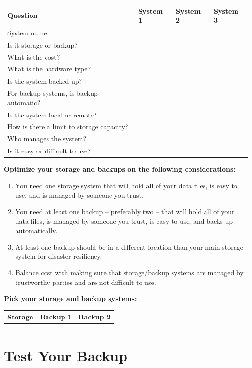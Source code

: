 \documentclass[
]{book}
\providecommand{\tightlist}{%
  \setlength{\itemsep}{0pt}\setlength{\parskip}{0pt}}
\begin{document}
\begin{tabular}{l|l|l|l}
\hline
Question & System 1 & System 2 & System 3\\
\hline
System name &  &  & \\
\hline
Is it storage or backup? &  &  & \\
\hline
What is the cost? &  &  & \\
\hline
What is the hardware type? &  &  & \\
\hline
Is the system backed up? &  &  & \\
\hline
For backup systems, is backup automatic? &  &  & \\
\hline
Is the system local or remote? &  &  & \\
\hline
How is there a limit to storage capacity? &  &  & \\
\hline
Who manages the system? &  &  & \\
\hline
Is it easy or difficult to use? &  &  & \\
\hline
\end{tabular}

\textbf{Optimize your storage and backups on the following considerations:}

\begin{enumerate}
\def\labelenumi{\arabic{enumi}.}
\tightlist
\item
  You need one storage system that will hold all of your data files, is easy to use, and is managed by someone you trust.
\item
  You need at least one backup -- preferably two -- that will hold all of your data files, is managed by someone you trust, is easy to use, and backs up automatically.
\item
  At least one backup should be in a different location than your main storage system for disaster resiliency.
\item
  Balance cost with making sure that storage/backup systems are managed by trustworthy parties and are not difficult to use.
\end{enumerate}

\textbf{Pick your storage and backup systems:}

\begin{tabular}{l|l|l}
\hline
Storage & Backup 1 & Backup 2\\
\hline
 &  & \\
\hline
\end{tabular}

\hypertarget{backup}{%
\section{Test Your Backup}\label{backup}}
\end{document}
